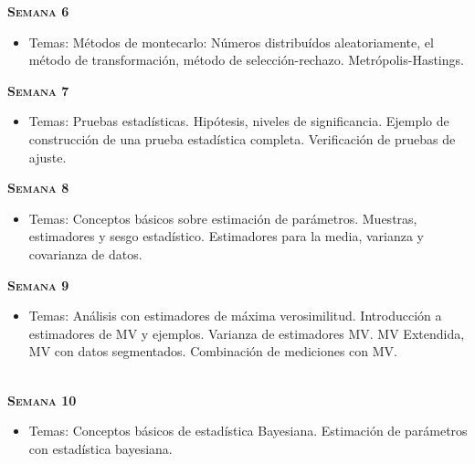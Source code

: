 \documentclass[letterpaper,10pt,onecolumn]{article}
\begin{document}
\noindent\textbf{\textsc{Semana 6}}\\[-0.5cm]
\begin{itemize}
\item Temas:  M\'etodos de montecarlo: N\'umeros distribu\'idos aleatoriamente, el m\'etodo de transformaci\'on, m\'etodo de selecci\'on-rechazo. Metr\'opolis-Hastings. \\[-0.6cm]
\end{itemize}


\noindent\textbf{\textsc{Semana 7}}\\[-0.5cm]
\begin{itemize}
\item Temas: Pruebas estad\'isticas. Hip\'otesis, niveles de significancia. Ejemplo de construcci\'on de una prueba estad\'istica completa. Verificaci\'on de pruebas de ajuste. \\[-0.6cm]
\end{itemize}

\noindent\textbf{\textsc{Semana 8}}\\[-0.5cm]
\begin{itemize}
\item Temas: Conceptos b\'asicos sobre estimaci\'on de par\'ametros. Muestras, estimadores y sesgo estad\'istico. Estimadores para la media, varianza y covarianza de datos. \\[-0.6cm]
\end{itemize}


\noindent\textbf{\textsc{Semana 9}}\\[-0.5cm]
\begin{itemize}
\item Temas: An\'alisis con estimadores de m\'axima verosimilitud. Introducci\'on a estimadores de MV y ejemplos. Varianza de estimadores MV. MV Extendida, MV con datos segmentados. Combinaci\'on de mediciones con MV. \\[-0.6cm]
\\[-0.6cm]
\end{itemize}

\noindent\textbf{\textsc{Semana 10}}\\[-0.5cm]
\begin{itemize}
\item Temas: Conceptos b\'asicos de estad\'istica Bayesiana. Estimaci\'on de par\'ametros con estad\'istica bayesiana. \\[-0.6cm]  
\end{itemize}
\end{document}
